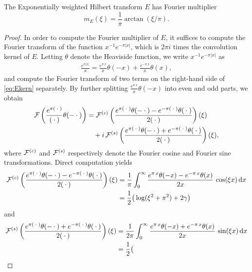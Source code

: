 \documentclass[../dissertation.tex]{subfiles}
\begin{document}
\begin{lma}\label{lma:FMultE}
	The Exponentially weighted Hilbert transform $E$ has Fourier multiplier
	$$m_E(\xi) = \frac{1}{\pi} \arctan(\xi/\pi).$$\label{sym3:Emult}
\end{lma}
\begin{proof}
	In order to compute the Fourier multiplier of $E$, it suffices to compute the Fourier
	transform of the function $x^{-1} e^{-\pi|x|}$, which is $2\pi i$ times the 
	convolution kernel of $E$. Letting $\theta$ denote the Heaviside function, we 
	write $x^{-1} e^{-\pi|x|}$ as 
	\begin{align}\label{eq:Ekern}
		\frac{e^{\pi |x|}}{x} 
			=
			\frac{e^{\pi \, x}}{x} \theta(-x) + \frac{e^{-\pi \, x}}{x} \theta(x),
	\end{align}
	and compute the Fourier transform of two terms on the right-hand side of 
	\eqref{eq:Ekern} separately. By further splitting $\frac{e^{\pi \, x}}{x} \theta(-x)$
	into even and odd parts, we obtain
	\begin{align}
		\mathcal F\left( \frac{e^{\pi (\kern 0.5ex \cdot \kern 0.5ex)}}{(\kern 0.5ex \cdot \kern 0.5ex)} \theta(-\kern 0.5ex \cdot \kern 0.5ex) \right)
			&= \mathcal F^{(c)} \left( 
					\frac{e^{\pi (\kern 0.5ex \cdot \kern 0.5ex)}\theta(-\kern 0.5ex \cdot \kern 0.5ex)-e^{-\pi(\kern 0.5ex \cdot \kern 0.5ex)}\theta(\kern 0.5ex \cdot \kern 0.5ex)}
						{2(\kern 0.5ex \cdot \kern 0.5ex)}  
				\right)(\xi)
				\\
			&\quad + i \, \mathcal F^{(s)} \left(
					\frac{e^{\pi(\kern 0.5ex \cdot \kern 0.5ex)}\theta(-\kern 0.5ex \cdot \kern 0.5ex)+e^{-\pi(\kern 0.5ex \cdot \kern 0.5ex)}\theta(\kern 0.5ex \cdot \kern 0.5ex)}
						{2(\kern 0.5ex \cdot \kern 0.5ex)} 
				\right)(\xi),
				\nonumber
	\end{align}
	where $\mathcal F^{(c)}$ and $\mathcal F^{(s)}$ respectively denote the Fourier cosine and
	Fourier sine transformations. Direct computation yields 
	\begin{align*}
		\mathcal F^{(c)} \left( 
			\frac{e^{\pi (\kern 0.5ex \cdot \kern 0.5ex)}\theta(-\kern 0.5ex \cdot \kern 0.5ex)-e^{-\pi(\kern 0.5ex \cdot \kern 0.5ex)}\theta(\kern 0.5ex \cdot \kern 0.5ex)}
				{2(\kern 0.5ex \cdot \kern 0.5ex)}  
		\right)(\xi)
			&= \frac{1}{\pi}
				\int_0^\infty 
					\frac{e^{\pi \,x}\theta(-x)-e^{-\pi\,x}\theta(x)}{2x}
				\, \cos(\xi x) \, \mathrm{d}x 
				\\
			&= \frac{1}{2} \big(
					\log(\xi^2 + \pi^2) + 2 \gamma
				\big)
				\nonumber
	\end{align*}
	and 
	\begin{align*}
		\mc F^{(s)} \left( 
			\frac{e^{\pi (\dotarg)}\theta(-\dotarg)+e^{-\pi(\dotarg)}\theta(\dotarg)}
				{2(\dotarg)}  
		\right)(\xi)
			&= \frac{1}{2\pi} 
				\int_0^\infty 
					\frac{e^{\pi \,x}\theta(-x)+e^{-\pi\,x}\theta(x)}{2x}
				\, \sin(\xi x) \, \mathrm{d}x 
				\\
			&= \frac{1}{2} \big(

\end{align*}
\end{proof}
\end{document}

